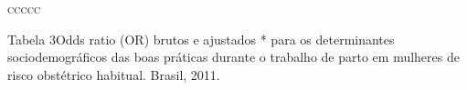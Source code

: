 \documentclass{article}
\begin{document}
\begin{table}
\begin{adjustbox}{width=1.1\textwidth}
\begin{tabulary}{\linewidth}{  \textsc{ccccc} }













\end{tabulary}
\end{adjustbox}
\caption{}
\end{table}

Tabela 3Odds ratio (OR) brutos e ajustados * para os determinantes
sociodemográficos das boas práticas durante o trabalho de parto em
mulheres de risco obstétrico habitual. Brasil, 2011.
\end{document}
